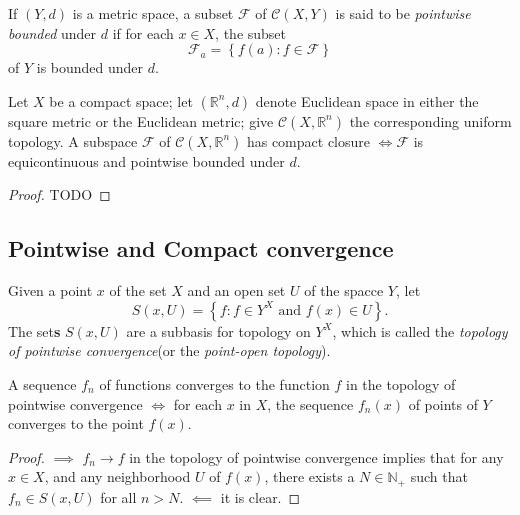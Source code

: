 \begin{definition}
  If \( (Y, d) \) is a metric space, a subset \( \mathcal{F} \) of \( \mathcal{C}(X, Y) \) is said to be \emph{pointwise bounded} under \( d \) if for each \( x \in X \), the subset
  \[
    \mathcal{F}_a = \left\lbrace f(a): f \in \mathcal{F} \right\rbrace
  \]
  of \( Y \) is bounded under \( d \).
\end{definition}

\begin{theorem}
  Let \( X \) be a compact space;
  let \( (\mathbb{R}^n, d) \) denote Euclidean space in either the square metric or the Euclidean metric;
  give \( \mathcal{C}(X, \mathbb{R}^n) \) the corresponding uniform topology.
  A subspace \( \mathcal{F} \) of \( \mathcal{C}(X, \mathbb{R}^n) \) has compact closure \( \iff \mathcal{F} \) is equicontinuous and pointwise bounded under \( d \).
\end{theorem}
\begin{proof}
  TODO %
\end{proof}

\subsection{Pointwise and Compact convergence}

\begin{definition}
  Given a point \( x \) of the set \( X \) and an open set \( U \) of the spacce \( Y \), let
  \[
    S(x, U) = \left\lbrace f: f \in Y^X \text{ and } f(x) \in U \right\rbrace.
  \]
  The set\textbf{s} \( S(x, U) \) are a subbasis for topology on \( Y^X \), which is called the \emph{topology of pointwise convergence}(or the \emph{point-open topology}).
\end{definition}

\begin{theorem}
  A sequence \( f_n \) of functions converges to the function \( f \) in the topology of pointwise convergence \( \iff \) for each \( x \) in \( X \), the sequence \( f_n(x) \) of points of \( Y \) converges to the point \( f(x) \).
\end{theorem}
\begin{proof}
  \( \implies \) \( f_n \to f \) in the topology of pointwise convergence implies that for any \( x \in X \), and any neighborhood \( U \) of \( f(x) \), there exists a \( N \in \mathbb{N}_+ \) such that \( f_n \in S(x, U) \) for all \( n > N \).
  \( \impliedby \) it is clear.
\end{proof}


